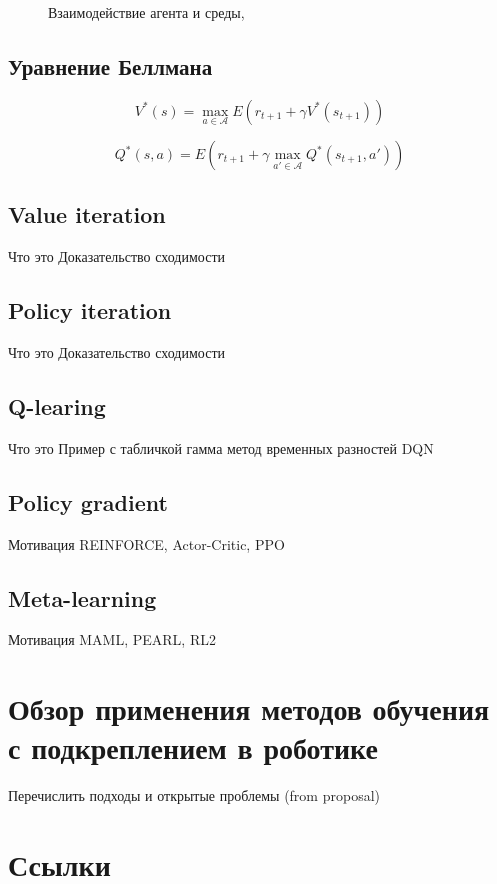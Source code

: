 \begin{figure}[ht]
	\label{img:rl}
	\caption{Взаимодействие агента и среды,}
\end{figure}

\subsection{Уравнение Беллмана}

\begin{equation}
	V^*(s) = \max_{a \in \mathcal{A}} E(r_{t + 1} + \gamma V^*(s_{t + 1}))
\end{equation}

\begin{equation}
Q^*(s, a) = E(r_{t + 1} + \gamma \max_{a' \in \mathcal{A}} Q^*(s_{t + 1}, a'))
\end{equation}
 
\subsection{Value iteration}
Что это
Доказательство сходимости 

\subsection{Policy iteration}
Что это 
Доказательство сходимости

\subsection{Q-learing}
Что это
Пример с табличкой
гамма
метод временных разностей
DQN

\subsection{Policy gradient}
Мотивация 
REINFORCE, Actor-Critic, PPO

\subsection{Meta-learning}
Мотивация MAML, PEARL, RL2

\section{Обзор применения методов обучения с подкреплением в роботике}\label{sec:ch1/sec2}
Перечислить подходы и открытые проблемы (from proposal)


\section{Ссылки}\label{sec:ch1/sec2}


\FloatBarrier
